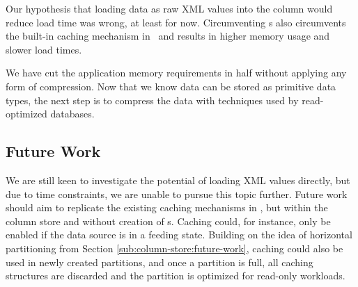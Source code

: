 Our hypothesis that loading data as raw XML values into the column would reduce load time was wrong, at least for now. Circumventing s also circumvents the built-in caching mechanism in \gap~and results in higher memory usage and slower load times.  

We have cut the application memory requirements in half without applying any form of compression. Now that we know data can be stored as primitive data types, the next step is to compress the data with techniques used by read-optimized databases.

\subsection{Future Work}
\label{sub:Future Work}
We are still keen to investigate the potential of loading XML values directly, but due to time constraints, we are unable to pursue this topic further. Future work should aim to replicate the existing caching mechanisms in \gap, but within the column store and without creation of s. Caching could, for instance, only be enabled if the data source is in a feeding state. Building on the idea of horizontal partitioning from Section \ref{sub:column-store:future-work}, caching could also be used in newly created partitions, and once a partition is full, all caching structures are discarded and the partition is optimized for read-only workloads.



